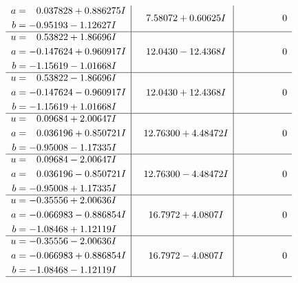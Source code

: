 \documentclass[1p]{elsarticle_modified}
\theoremstyle{definition}
\begin{document}
$$\begin{array}{c|c|c}
\begin{aligned}
a &= \phantom{-}0.037828 + 0.886275 I \\
b &= -0.95193 - 1.12627 I\end{aligned}
 & \phantom{-}7.58072 + 0.60625 I & \phantom{-0.000000 } 0 \\ \hline\begin{aligned}
u &= \phantom{-}0.53822 + 1.86696 I \\
a &= -0.147624 + 0.960917 I \\
b &= -1.15619 - 1.01668 I\end{aligned}
 & \phantom{-}12.0430 - 12.4368 I & \phantom{-0.000000 } 0 \\ \hline\begin{aligned}
u &= \phantom{-}0.53822 - 1.86696 I \\
a &= -0.147624 - 0.960917 I \\
b &= -1.15619 + 1.01668 I\end{aligned}
 & \phantom{-}12.0430 + 12.4368 I & \phantom{-0.000000 } 0 \\ \hline\begin{aligned}
u &= \phantom{-}0.09684 + 2.00647 I \\
a &= \phantom{-}0.036196 + 0.850721 I \\
b &= -0.95008 - 1.17335 I\end{aligned}
 & \phantom{-}12.76300 + 4.48472 I & \phantom{-0.000000 } 0 \\ \hline\begin{aligned}
u &= \phantom{-}0.09684 - 2.00647 I \\
a &= \phantom{-}0.036196 - 0.850721 I \\
b &= -0.95008 + 1.17335 I\end{aligned}
 & \phantom{-}12.76300 - 4.48472 I & \phantom{-0.000000 } 0 \\ \hline\begin{aligned}
u &= -0.35556 + 2.00636 I \\
a &= -0.066983 - 0.886854 I \\
b &= -1.08468 + 1.12119 I\end{aligned}
 & \phantom{-}16.7972 + 4.0807 I & \phantom{-0.000000 } 0 \\ \hline\begin{aligned}
u &= -0.35556 - 2.00636 I \\
a &= -0.066983 + 0.886854 I \\
b &= -1.08468 - 1.12119 I\end{aligned}
 & \phantom{-}16.7972 - 4.0807 I & \phantom{-0.000000 } 0\\
 \hline 
 \end{array}$$\newpage\newpage\renewcommand{\arraystretch}{1}
\end{document}

